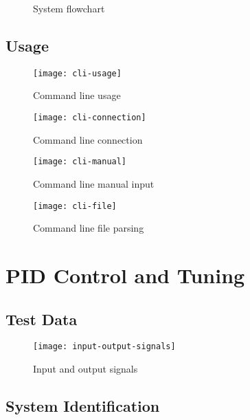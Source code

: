 \begin{figure}[]
    \centering
    
    \caption{System flowchart}
    \label{fig:system-flowchart}
\end{figure}


\subsection{Usage}

\begin{figure}[]
    \centering
    \texttt{[image: cli-usage]}
    \caption{Command line usage}
    \label{fig:cli-usage}
\end{figure}

\begin{figure}[]
    \centering
    \texttt{[image: cli-connection]}
    \caption{Command line connection}
    \label{fig:cli-connection}
\end{figure}

\begin{figure}[]
    \centering
    \texttt{[image: cli-manual]}
    \caption{Command line manual input}
    \label{fig:cli-manual}
\end{figure}

\begin{figure}[]
    \centering
    \texttt{[image: cli-file]}
    \caption{Command line file parsing}
    \label{fig:cli-file}
\end{figure}

\section{PID Control and Tuning}

\subsection{Test Data}
\begin{figure}[h]
    \centering
    \texttt{[image: input-output-signals]}
    \caption{Input and output signals}
    \label{fig:io-signals}
\end{figure}

\subsection{System Identification}

